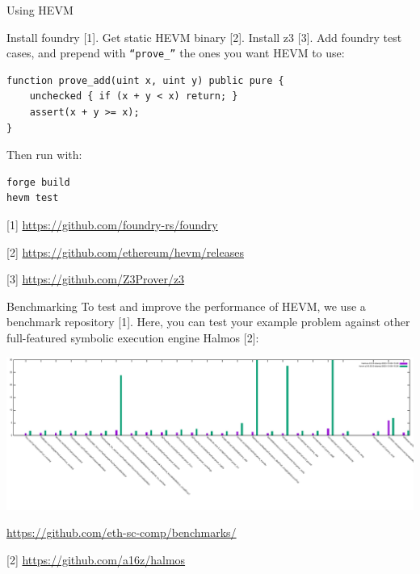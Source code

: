 \documentclass[aspectratio=169]{beamer}
\begin{document}
\begin{frame}[fragile=singleslide]{Using HEVM}

Install foundry [1]. Get static HEVM binary [2]. Install z3 [3]. Add foundry test cases, and prepend with \texttt{``prove\_''} the ones you want HEVM to use:

\begin{Verbatim}[frame=single, framerule=0.2mm, framesep=2mm,fontsize=\footnotesize]
function prove_add(uint x, uint y) public pure {
    unchecked { if (x + y < x) return; }
    assert(x + y >= x);
}
\end{Verbatim}

Then run with:

\begin{Verbatim}[frame=single, framerule=0.2mm, framesep=2mm,fontsize=\footnotesize]
forge build
hevm test
\end{Verbatim}


\bigskip

[1] \url{https://github.com/foundry-rs/foundry}

[2] \url{https://github.com/ethereum/hevm/releases}

[3] \url{https://github.com/Z3Prover/z3}
\end{frame}


\begin{frame}[fragile=singleslide]{Benchmarking}
\small
To test and improve the performance of HEVM, we use a benchmark repository [1]. Here, you can test your example problem against other full-featured symbolic execution engine Halmos [2]:

\includegraphics[scale=0.7]{boxchart}

\bigskip
[1] \url{https://github.com/eth-sc-comp/benchmarks/}

[2] \url{https://github.com/a16z/halmos}
\end{frame}


%
%
%
%
%
%
\end{document}
